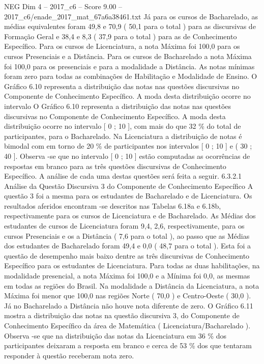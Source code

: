 \begin{textsample}{NEG Dim 4 – 2017\_c6 – Score 9.00 – 2017\_c6/enade\_2017\_mat\_67a6a38461.txt}
Já para os cursos de Bacharelado, as médias equivalentes foram 49,8 e 70,9 ( 50,1 para o total ) para as discursivas de Formação Geral e 38,4 e 8,3 ( 37,9 para o total ) para as de Conhecimento Específico.
Para os cursos de Licenciatura, a nota Máxima foi 100,0 para os cursos Presenciais e a Distância.
Para os cursos de Bacharelado a nota Máxima foi 100,0 para os presenciais e para a modalidade a Distância.
As notas mínimas foram zero para todas as combinações de Habilitação e Modalidade de Ensino.
O Gráfico 6.10 representa a distribuição das notas nas questões discursivas no Componente de Conhecimento Específico.
A moda desta distribuição ocorre no intervalo O Gráfico 6.10 representa a distribuição das notas nas questões discursivas no Componente de Conhecimento Específico.
A moda desta distribuição ocorre no intervalo [ 0 ; 10 ], com mais do que 32 \% do total de participantes, para o Bacharelado.
Na Licenciatura a distribuição de notas é bimodal com em torno de 20 \% de participantes nos intervalos [ 0 ; 10 ] e ( 30 ; 40 ].
Observa -se que no intervalo [ 0 ; 10 ] estão computadas as ocorrências de respostas em branco para as três questões discursivas de Conhecimento Específico.
A análise de cada uma destas questões será feita a seguir. 6.3.2.1 Análise da Questão Discursiva 3 do Componente de Conhecimento Específico A questão 3 foi a mesma para os estudantes de Bacharelado e de Licenciatura.
Os resultados aferidos encontram -se descritos nas Tabelas 6.18a e 6.18b, respectivamente para os cursos de Licenciatura e de Bacharelado.
As Médias dos estudantes de cursos de Licenciatura foram 9,4, 2,6, respectivamente, para os cursos Presenciais e os a Distância ( 7,6 para o total ), ao passo que as Médias dos estudantes de Bacharelado foram 49,4 e 0,0 ( 48,7 para o total ).
Esta foi a questão de desempenho mais baixo dentre as três discursivas de Conhecimento Específico para os estudantes de Licenciatura.
Para todas as duas habilitações, na modalidade presencial, a nota Máxima foi 100,0 e a Mínima foi 0,0, as mesmas em todas as regiões do Brasil.
Na modalidade a Distância da Licenciatura, a nota Máxima foi menor que 100,0 nas regiões Norte ( 70,0 ) e Centro-Oeste ( 30,0 ).
Já no Bacharelado a Distância não houve nota diferente de zero.
O Gráfico 6.11 mostra a distribuição das notas na questão discursiva 3, do Componente de Conhecimento Específico da área de Matemática ( Licenciatura/Bacharelado ).
Observa -se que na distribuição das notas da Licenciatura em 36 \% dos participantes deixaram a resposta em branco e cerca de 53 \% dos que tentaram responder à questão receberam nota zero.

\end{textsample}
